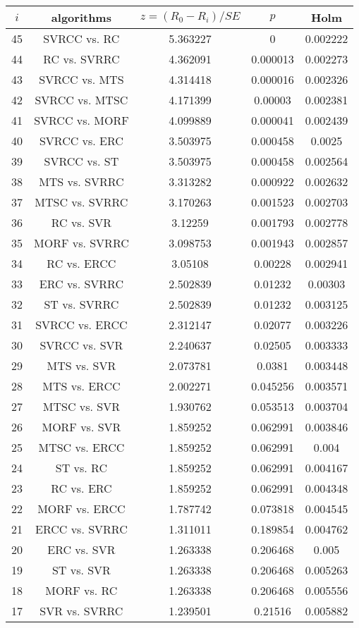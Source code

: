 \documentclass[a4paper,10pt]{article}
\begin{document}
\begin{landscape}
\begin{table}[!htp]
\centering\scriptsize
\begin{tabular}{ccccc}
$i$&algorithms&$z=(R_0 - R_i)/SE$&$p$&Holm\\
\hline45&SVRCC vs. RC&5.363227&0&0.002222\\
44&RC vs. SVRRC&4.362091&0.000013&0.002273\\
43&SVRCC vs. MTS&4.314418&0.000016&0.002326\\
42&SVRCC vs. MTSC&4.171399&0.00003&0.002381\\
41&SVRCC vs. MORF&4.099889&0.000041&0.002439\\
40&SVRCC vs. ERC&3.503975&0.000458&0.0025\\
39&SVRCC vs. ST&3.503975&0.000458&0.002564\\
38&MTS vs. SVRRC&3.313282&0.000922&0.002632\\
37&MTSC vs. SVRRC&3.170263&0.001523&0.002703\\
36&RC vs. SVR&3.12259&0.001793&0.002778\\
35&MORF vs. SVRRC&3.098753&0.001943&0.002857\\
34&RC vs. ERCC&3.05108&0.00228&0.002941\\
33&ERC vs. SVRRC&2.502839&0.01232&0.00303\\
32&ST vs. SVRRC&2.502839&0.01232&0.003125\\
31&SVRCC vs. ERCC&2.312147&0.02077&0.003226\\
30&SVRCC vs. SVR&2.240637&0.02505&0.003333\\
29&MTS vs. SVR&2.073781&0.0381&0.003448\\
28&MTS vs. ERCC&2.002271&0.045256&0.003571\\
27&MTSC vs. SVR&1.930762&0.053513&0.003704\\
26&MORF vs. SVR&1.859252&0.062991&0.003846\\
25&MTSC vs. ERCC&1.859252&0.062991&0.004\\
24&ST vs. RC&1.859252&0.062991&0.004167\\
23&RC vs. ERC&1.859252&0.062991&0.004348\\
22&MORF vs. ERCC&1.787742&0.073818&0.004545\\
21&ERCC vs. SVRRC&1.311011&0.189854&0.004762\\
20&ERC vs. SVR&1.263338&0.206468&0.005\\
19&ST vs. SVR&1.263338&0.206468&0.005263\\
18&MORF vs. RC&1.263338&0.206468&0.005556\\
17&SVR vs. SVRRC&1.239501&0.21516&0.005882\\

\end{tabular}
\end{table}
\end{landscape}
\end{document}
